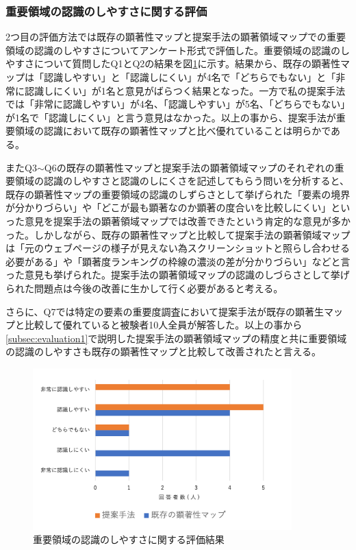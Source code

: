 \subsubsection{重要領域の認識のしやすさに関する評価}
\par 2つ目の評価方法では既存の顕著性マップと提案手法の顕著領域マップでの重要領域の認識のしやすさについてアンケート形式で評価した。重要領域の認識のしやすさについて質問したQ1とQ2の結果を図\ref{fig_evaluation02-1}に示す。結果から、既存の顕著性マップは「認識しやすい」と「認識しにくい」が4名で「どちらでもない」と「非常に認識しにくい」が1名と意見がばらつく結果となった。一方で私の提案手法では「非常に認識しやすい」が4名、「認識しやすい」が5名、「どちらでもない」が1名で「認識しにくい」と言う意見はなかった。以上の事から、提案手法が重要領域の認識において既存の顕著性マップと比べ優れていることは明らかである。
\par またQ3$\sim$Q6の既存の顕著性マップと提案手法の顕著領域マップのそれぞれの重要領域の認識のしやすさと認識のしにくさを記述してもらう問いを分析すると、既存の顕著性マップの重要領域の認識のしずらさとして挙げられた「要素の境界が分かりづらい」や「どこが最も顕著なのか顕著の度合いを比較しにくい」といった意見を提案手法の顕著領域マップでは改善できたという肯定的な意見が多かった。しかしながら、既存の顕著性マップと比較して提案手法の顕著領域マップは「元のウェブページの様子が見えない為スクリーンショットと照らし合わせる必要がある」や「顕著度ランキングの枠線の濃淡の差が分かりづらい」などと言った意見も挙げられた。提案手法の顕著領域マップの認識のしづらさとして挙げられた問題点は今後の改善に生かして行く必要があると考える。
\par さらに、Q7では特定の要素の重要度調査において提案手法が既存の顕著生マップと比較して優れていると被験者10人全員が解答した。以上の事から\ref{subsec:evaluation1}で説明した提案手法の顕著領域マップの精度と共に重要領域の認識のしやすさも既存の顕著性マップと比較して改善されたと言える。

\begin{figure}[H]
    \centering
    \includegraphics[width=10cm]{figures/result01.png}
    \caption{重要領域の認識のしやすさに関する評価結果}
    \label{fig_evaluation02-1}
\end{figure}

